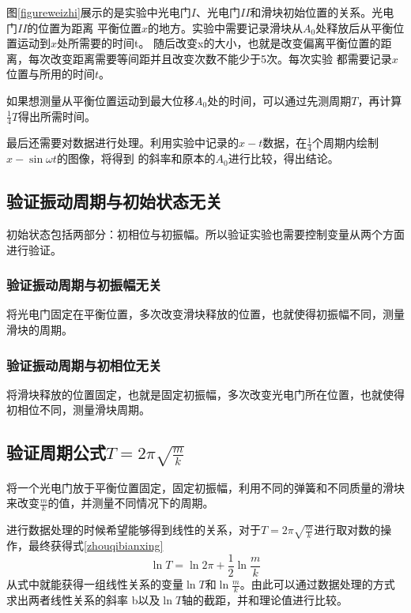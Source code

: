 \documentclass{ctexart}
\begin{document}
  图\ref{figureweizhi}展示的是实验中光电门$I$、光电门$II$和滑块初始位置的关系。光电门$II$的位置为距离
  平衡位置$x$的地方。实验中需要记录滑块从$A_{0}$处释放后从平衡位置运动到$x$处所需要的时间t。
  随后改变x的大小，也就是改变偏离平衡位置的距离，每次改变距离需要等间距并且改变次数不能少于5次。每次实验
  都需要记录$x$位置与所用的时间$t$。

  如果想测量从平衡位置运动到最大位移$A_{0}$处的时间，可以通过先测周期$T$，再计算$\frac{1}{4}T$得出所需时间。
  
  最后还需要对数据进行处理。利用实验中记录的$x-t$数据，在$\frac{1}{4}$个周期内绘制$x-\sin{\omega t}$的图像，将得到
  的斜率和原本的$A_{0}$进行比较，得出结论。

  \subsection{验证振动周期与初始状态无关}
  初始状态包括两部分：初相位与初振幅。所以验证实验也需要控制变量从两个方面进行验证。
    \subsubsection{验证振动周期与初振幅无关}
    将光电门固定在平衡位置，多次改变滑块释放的位置，也就使得初振幅不同，测量滑块的周期。
    \subsubsection{验证振动周期与初相位无关}
    将滑块释放的位置固定，也就是固定初振幅，多次改变光电门所在位置，也就使得初相位不同，测量滑块周期。

  \subsection{验证周期公式$T=2\pi \sqrt{\frac{m}{k}}$}
  将一个光电门放于平衡位置固定，固定初振幅，利用不同的弹簧和不同质量的滑块来改变$\frac{m}{k}$的值，并测量不同情况下的周期。

  进行数据处理的时候希望能够得到线性的关系，对于$T=2\pi \sqrt{\frac{m}{k}}$进行取对数的操作，最终获得式\ref{zhouqibianxing}
  \begin{equation}\label{zhouqibianxing}
    \ln T = \ln 2\pi +\frac{1}{2} \ln \frac{m}{k}
  \end{equation}
  从式中就能获得一组线性关系的变量$\ln T \mbox{和} \ln \frac{m}{k}$。由此可以通过数据处理的方式求出两者线性关系的斜率
  b以及$\ln T$轴的截距，并和理论值进行比较。
\newpage
\end{document}
